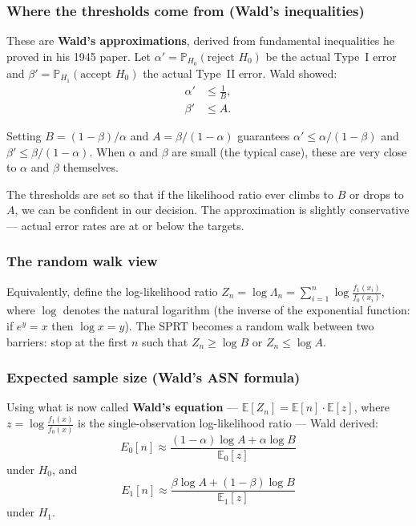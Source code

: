 \documentclass[12pt, a4paper]{article}
\newcommand{\E}{\mathbb{E}}            %
\newcommand{\Prob}{\mathbb{P}}         %
\newcommand{\LR}{\Lambda}              %
\begin{document}
\subsubsection*{Where the thresholds come from (Wald's inequalities)}

These are \textbf{Wald's approximations}, derived from fundamental
inequalities he proved in his 1945 paper.  Let $\alpha' = \Prob_{H_0}(\text{reject } H_0)$
be the actual Type~I error and $\beta' = \Prob_{H_1}(\text{accept } H_0)$ the
actual Type~II error.  Wald showed:
\begin{align*}
  \alpha' &\leq \frac{1}{B}, \\
  \beta' &\leq A.
\end{align*}

Setting $B = (1-\beta)/\alpha$ and $A = \beta/(1-\alpha)$ guarantees
$\alpha' \leq \alpha/(1-\beta)$ and $\beta' \leq \beta/(1-\alpha)$.  When
$\alpha$ and $\beta$ are small (the typical case), these are very close to
$\alpha$ and $\beta$ themselves.

\begin{plainlanguage}
The thresholds are set so that if the likelihood ratio ever climbs to $B$ or
drops to $A$, we can be confident in our decision.  The approximation is
slightly conservative --- actual error rates are at or below the targets.
\end{plainlanguage}

\subsubsection*{The random walk view}

Equivalently, define the log-likelihood ratio $Z_n = \log \LR_n =
\sum_{i=1}^n \log \frac{f_1(x_i)}{f_0(x_i)}$, where $\log$ denotes the
natural logarithm (the inverse of the exponential function: if $e^y = x$
then $\log x = y$).  The SPRT becomes a random
walk between two barriers: stop at the first $n$ such that $Z_n \geq \log B$
or $Z_n \leq \log A$.

\subsubsection*{Expected sample size (Wald's ASN formula)}

Using what is now called \textbf{Wald's equation} --- $\E[Z_n] = \E[n]
\cdot \E[z]$, where $z = \log \frac{f_1(x)}{f_0(x)}$ is the single-observation
log-likelihood ratio --- Wald derived:
\[
  \boxed{E_0[n] \approx \frac{(1-\alpha)\log A + \alpha \log B}{\E_0[z]}}
\]
under $H_0$, and
\[
  \boxed{E_1[n] \approx \frac{\beta \log A + (1-\beta)\log B}{\E_1[z]}}
\]
under $H_1$.
\end{document}

